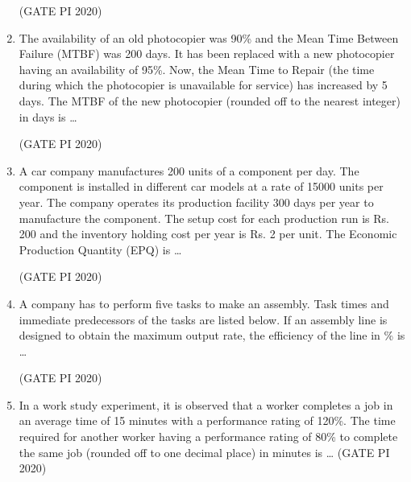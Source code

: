 \documentclass[journal,12pt,onecolumn]{IEEEtran}
\theoremstyle{remark}
\begin{document}
\begin{enumerate}
\hfill (GATE PI 2020)

\item The availability of an old photocopier was 90\% and the Mean Time Between Failure (MTBF) was 200 days. It has been replaced with a new photocopier having an availability of 95\%. Now, the Mean Time to Repair (the time during which the photocopier is unavailable for service) has increased by 5 days. The MTBF of the new photocopier (rounded off to the nearest integer) in days is \dots

\hfill (GATE PI 2020)

\item A car company manufactures 200 units of a component per day. The component is installed in different car models at a rate of 15000 units per year. The company operates its production facility 300 days per year to manufacture the component. The setup cost for each production run is Rs. 200 and the inventory holding cost per year is Rs. 2 per unit. The Economic Production Quantity (EPQ) is \dots

\hfill (GATE PI 2020)

\item A company has to perform five tasks  to make an assembly. Task times and immediate predecessors of the tasks are listed below. If an assembly line is designed to obtain the maximum output rate, the efficiency of the line in \% is \dots



\hfill (GATE PI 2020)

\item In a work study experiment, it is observed that a worker completes a job in an average time of 15 minutes with a performance rating of 120\%. The time required for another worker having a performance rating of 80\% to complete the same job (rounded off to one decimal place) in minutes is \dots
\hfill (GATE PI 2020)

\end{enumerate}
\end{document}
